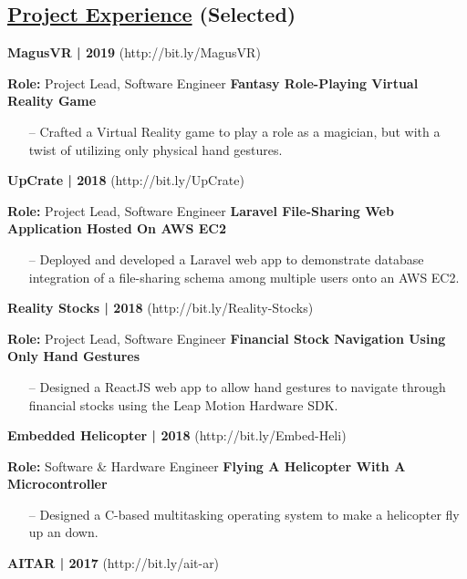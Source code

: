 \documentclass{article}
\begin{document}
\begin{multicols}{2}
\section*{\underline{Project Experience} {\small(Selected)}}
{\footnotesize{\textbf{MagusVR | 2019} (http://bit.ly/MagusVR)}}
{\footnotesize{
\newline\textbf{Role:} Project Lead, Software Engineer
\newline\textbf{Fantasy Role-Playing Virtual Reality Game}
\begin{itemize}
	\item[--] Crafted a Virtual Reality game to play a role as a magician, but with a twist of utilizing only physical hand gestures.
\end{itemize}
\hfill \break
}}
{\footnotesize{\textbf{UpCrate | 2018} (http://bit.ly/UpCrate)}}
{\footnotesize{
\newline\textbf{Role:} Project Lead, Software Engineer
\newline\textbf{Laravel File-Sharing Web Application Hosted On AWS EC2}
\begin{itemize}
	\item[--] Deployed and developed a Laravel web app to demonstrate database integration of a file-sharing schema among multiple users onto an AWS EC2.
\end{itemize}
\hfill \break
}}
{\footnotesize{\textbf{Reality Stocks | 2018} (http://bit.ly/Reality-Stocks)}}
{\footnotesize{
\newline\textbf{Role:} Project Lead, Software Engineer
\newline\textbf{Financial Stock Navigation Using Only Hand Gestures}
\begin{itemize}
	\item[--] Designed a ReactJS web app to allow hand gestures to navigate through financial stocks using the Leap Motion Hardware SDK.
\end{itemize}
}}
\hfill \break
{\footnotesize{\textbf{Embedded Helicopter | 2018} (http://bit.ly/Embed-Heli)}}
{\footnotesize{
\newline\textbf{Role:} Software \& Hardware Engineer
\newline\textbf{Flying A Helicopter With A Microcontroller}
\begin{itemize}
	\item[--] Designed a C-based multitasking operating system to make a helicopter fly up an down.
\end{itemize}
}}
\hfill \break
{\footnotesize{\textbf{AITAR | 2017} (http://bit.ly/ait-ar)}}

\end{multicols}
\end{document}
